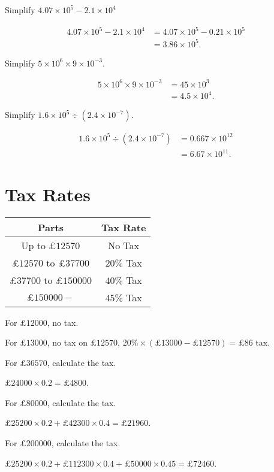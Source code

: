 \documentclass[8pt]{article}
\begin{document}
		\prob Simplify \(4.07 \times 10^5 - 2.1 \times 10^4\)
		
		\solution

		\begin{align*}
			4.07 \times 10^5 - 2.1 \times 10^4 &= 4.07 \times 10^5 - 0.21 \times 10^5\\
			&= 3.86 \times 10^5.
		\end{align*}

		\prob Simplify \(5 \times 10^6 \times 9 \times 10^{-3}\). 
		
		\solution
		
		\begin{align*}
			5 \times 10^6 \times 9 \times 10^{-3} &= 45 \times 10^{3}\\
			&= 4.5 \times 10^{4}.
		\end{align*}

		\prob Simplify \(1.6 \times 10^5 \div (2.4 \times 10^{-7})\).
		
		\solution
		
		\begin{align*}
			1.6 \times 10^5 \div (2.4 \times 10^{-7}) &= 0.667 \times 10^{12}\\
			&= 6.67 \times 10^{11}.
		\end{align*}

	\section{Tax Rates}

		\exmp \exmpword{(UK Tax Rates)}

		\begin{center}
			\begin{tabular}{c|c}
				Parts & Tax Rate\\
				\hline
				\hline
				Up to \(\pounds 12570\) & No Tax\\
				\(\pounds 12570\) to \(\pounds 37700\) & \(20\%\) Tax\\
				\(\pounds 37700\) to \(\pounds 150000\) & \(40\%\) Tax\\
				\(\pounds 150000-\) & \(45\%\) Tax
			\end{tabular}
		\end{center}

		\exmp {} For \(\pounds 12000\), no tax.

		\exmp {} For \(\pounds 13000\), no tax on \(\pounds 12570\), \(20\% \times (\pounds 13000-\pounds 12570) = \pounds 86\) tax.\newline

		\prob For \(\pounds 36570\), calculate the tax.
		
		\solution \(\pounds 24000 \times 0.2 = \pounds 4800\).\newline

		\prob For \(\pounds 80000\), calculate the tax.
		
		\solution \(\pounds 25200 \times 0.2 + \pounds 42300 \times 0.4 = \pounds 21960\).\newline

		\prob For \(\pounds 200000\), calculate the tax.
		
		\solution \(\pounds 25200 \times 0.2 + \pounds 112300 \times 0.4 + \pounds 50000 \times 0.45 = \pounds 72460\).
\end{document}
